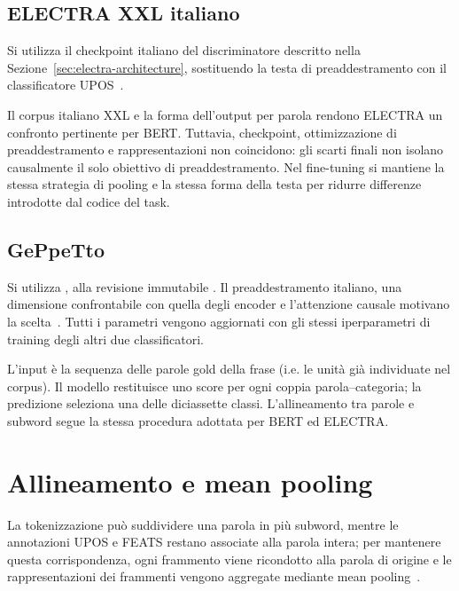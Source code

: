 \documentclass[12pt,a4paper]{report}
\newcommand{\modelid}[1]{{\small\path{#1}}}
\begin{document}
\subsection{ELECTRA XXL italiano}
Si utilizza il checkpoint italiano del discriminatore descritto nella Sezione~\ref{sec:electra-architecture}, sostituendo la testa di preaddestramento con il classificatore UPOS~\cite{electramodel}.

Il corpus italiano XXL e la forma dell'output per parola rendono ELECTRA un confronto pertinente per BERT. Tuttavia, checkpoint, ottimizzazione di preaddestramento e rappresentazioni non coincidono: gli scarti finali non isolano causalmente il solo obiettivo di preaddestramento. Nel fine-tuning si mantiene la stessa strategia di pooling e la stessa forma della testa per ridurre differenze introdotte dal codice del task.

\subsection{GePpeTto}
\label{subsec:geppetto-checkpoint}

Si utilizza \modelid{LorenzoDeMattei/GePpeTto}, alla revisione immutabile . Il preaddestramento italiano, una dimensione confrontabile con quella degli encoder e l'attenzione causale motivano la scelta~\cite{geppetto2020,geppettomodel}. Tutti i parametri vengono aggiornati con gli stessi iperparametri di training degli altri due classificatori.

L'input è la sequenza delle parole gold della frase (i.e. le unità già individuate nel corpus). Il modello restituisce uno score per ogni coppia parola--categoria; la predizione seleziona una delle diciassette classi. L'allineamento tra parole e subword segue la stessa procedura adottata per BERT ed ELECTRA.

\section{Allineamento e mean pooling}
\label{sec:pooling}
La tokenizzazione può suddividere una parola in più subword, mentre le annotazioni UPOS e FEATS restano associate alla parola intera; per mantenere questa corrispondenza, ogni frammento viene ricondotto alla parola di origine e le rappresentazioni dei frammenti vengono aggregate mediante mean pooling~\cite{acs2021}.
\end{document}
